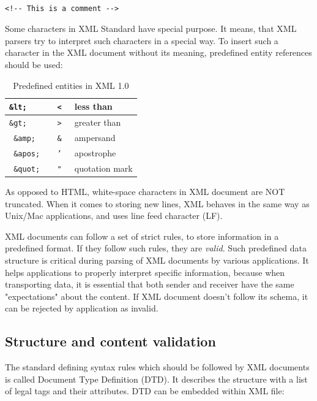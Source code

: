{\tt \small
\begin{verbatim}
<!-- This is a comment --> 
\end{verbatim}
}

\noindent Some characters in XML Standard have special purpose. It means, that XML parsers try to interpret such characters in a special way. To insert such a character in the XML document without its meaning, predefined entity references should be used:

\medskip

\begin{table}[htp]
\centering
\begin{tabular}{ |>{\tt}p{2cm}|>{\tt}l|l| }
    \hline
    \&lt;       & <     & less than \\ \hline
    \&gt;       & >     & greater than \\ \hline
    \&amp;      & \&    & ampersand \\ \hline
    \&apos;     & '     & apostrophe \\ \hline
    \&quot;     & "     & quotation mark \\ \hline
\end{tabular}
\caption{Predefined entities in XML 1.0}
\end{table}

\noindent As opposed to HTML, white-space characters in XML document are NOT truncated. When it comes to storing new lines, XML behaves in the same way as Unix/Mac applications, and uses line feed character (LF).

XML documents can follow a set of strict rules, to store information in a predefined format. If they follow such rules, they are \textit{valid}. Such predefined data structure is critical during parsing of XML documents by various applications. It helps applications to properly interpret specific information, because when transporting data, it is essential that both sender and receiver have the same "expectations" about the content. If XML document doesn't follow its schema, it can be rejected by application as invalid. 

\subsection{Structure and content validation}
\label{sub:dtd}

The standard defining syntax rules which should be followed by XML documents is called Document Type Definition (DTD). It describes the structure with a list of legal tags and their attributes. DTD can be embedded within XML file: 

